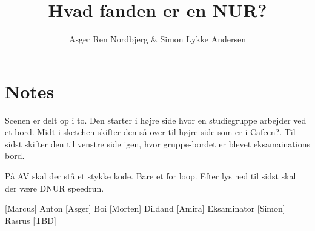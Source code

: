\documentclass{article}
\title{Hvad fanden er en NUR?}                   %
\author{Asger Ren Nordbjerg \& Simon Lykke Andersen}  %
\begin{document}
                
\maketitle
\section*{Notes}

Scenen er delt op i to. Den starter i højre side hvor en studiegruppe arbejder ved et bord. Midt i sketchen skifter den så over til højre side som er i Cafeen?. Til sidst skifter den til venstre side igen, hvor gruppe-bordet er blevet eksamainations bord. 

På AV skal der stå et stykke kode. Bare et for loop. Efter lys ned til sidst skal der være DNUR speedrun.
    
\begin{roles}
 [Marcus] Anton
 [Asger] Boi
 [Morten] Dildand
 [Amira] Eksaminator
 [Simon] Rasrus
 [TBD]
\end{roles}

\begin{props}
\end{props}
\end{document}
